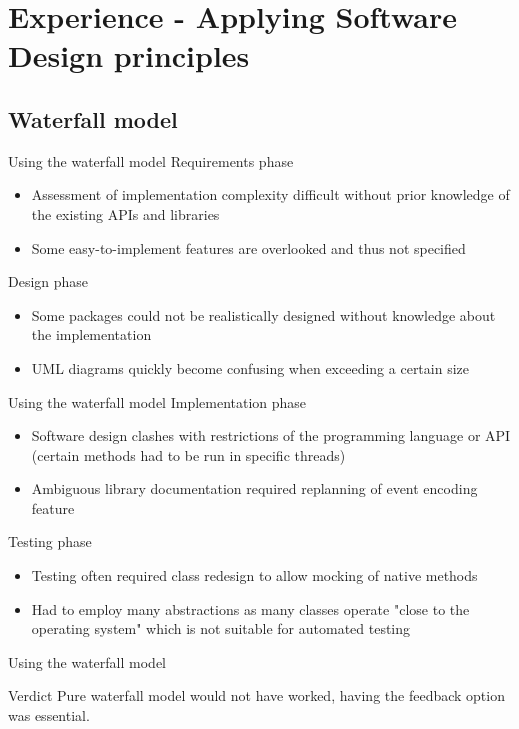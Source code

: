  \section{Experience - Applying Software Design principles}
 \subsection{Waterfall model}
\begin{frame}{Using the waterfall model}
Requirements phase
\begin{itemize}
\item Assessment of implementation complexity difficult without prior knowledge of the existing APIs and libraries
\item Some easy-to-implement features are overlooked and thus not specified
\end{itemize}
Design phase
\begin{itemize}
\item Some packages could not be realistically designed without knowledge about the implementation
\item UML diagrams quickly become confusing when exceeding a certain size
\end{itemize}

\end{frame}
\begin{frame}{Using the waterfall model}
Implementation phase
\begin{itemize}
\item Software design clashes with restrictions of the programming language or API (certain methods had to be run in specific threads)
\item Ambiguous library documentation required replanning of event encoding feature
\end{itemize}

Testing phase
\begin{itemize}
\item Testing often required class redesign to allow mocking of native methods
\item Had to employ many abstractions as many classes operate "close to the operating system" which is not suitable for automated testing
\end{itemize}
\end{frame}

\begin{frame}{Using the waterfall model}
\begin{block}{Verdict}
Pure waterfall model would not have worked, having the feedback option was essential.
\end{block}
\end{frame}